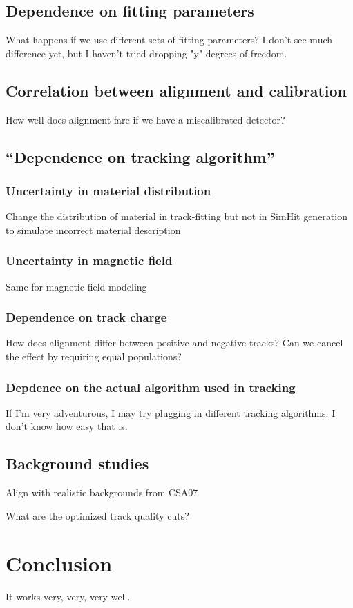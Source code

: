 \documentclass[12pt]{article}
\begin{document}
\subsection{Dependence on fitting parameters}

What happens if we use different sets of fitting parameters?  I
don't see much difference yet, but I haven't tried dropping "y"
degrees of freedom.

\subsection{Correlation between alignment and calibration}

How well does alignment fare if we have a miscalibrated detector?

\subsection{``Dependence on tracking algorithm''}

\subsubsection{Uncertainty in material distribution}
Change the distribution of material in track-fitting but not
in SimHit generation to simulate incorrect material
description

\subsubsection{Uncertainty in magnetic field}

Same for magnetic field modeling

\subsubsection{Dependence on track charge}

How does alignment differ between positive and negative
tracks?  Can we cancel the effect by requiring equal
populations?

\subsubsection{Depdence on the actual algorithm used in tracking}

If I'm very adventurous, I may try plugging in different
tracking algorithms.  I don't know how easy that is.

\subsection{Background studies}

Align with realistic backgrounds from CSA07

What are the optimized track quality cuts?

\section{Conclusion}

It works very, very, very well.
\end{document}
